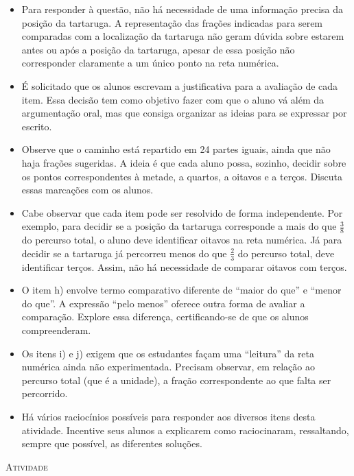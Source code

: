 \documentclass[10 pt,usenames,dvipsnames, oneside]{article}
\begin{document}
\begin{goals}
\begin{itemize}
\item Para responder à questão, não há necessidade de uma informação precisa da posição da tartaruga. A representação das frações indicadas para serem comparadas com a localização da tartaruga não geram dúvida sobre estarem antes ou após a posição da tartaruga, apesar de essa posição não corresponder claramente a um único ponto na reta numérica.
\item É solicitado que os alunos escrevam a justificativa para a avaliação de cada item. Essa decisão tem como objetivo fazer com que o aluno vá além da argumentação oral, mas que consiga organizar as ideias para se expressar por escrito.
\item Observe que o caminho está repartido em 24 partes iguais, ainda que não haja frações sugeridas. A ideia é que cada aluno possa, sozinho, decidir sobre os pontos correspondentes à metade, a quartos, a oitavos e a terços. Discuta essas marcações com os alunos.
\item Cabe observar que cada item pode ser resolvido de forma independente. Por exemplo, para decidir se a posição da tartaruga corresponde a mais do que       $\frac{3}{8}$       do percurso total, o aluno deve identificar oitavos na reta numérica. Já para decidir se a tartaruga já percorreu menos do que       $\frac{2}{3}$       do percurso total, deve identificar terços. Assim, não há necessidade de comparar oitavos com terços.
\item O item h) envolve termo comparativo diferente de ``maior do que'' e ``menor do que''. A expressão ``pelo menos'' oferece outra forma de avaliar a comparação. Explore essa diferença, certificando-se de que os alunos compreenderam.
\item Os itens i) e j) exigem que os estudantes façam uma ``leitura'' da reta numérica ainda não experimentada. Precisam observar, em relação ao percurso total (que é a unidade), a fração correspondente ao que falta ser percorrido.
\item Há vários raciocínios possíveis para responder aos diversos itens desta atividade. Incentive seus alunos a explicarem como raciocinaram, ressaltando, sempre que possível, as diferentes soluções.
\end{itemize}
\end{goals}

\bigskip
\begin{center}
{\large \scshape Atividade}
\end{center}
\fi
\end{document}
